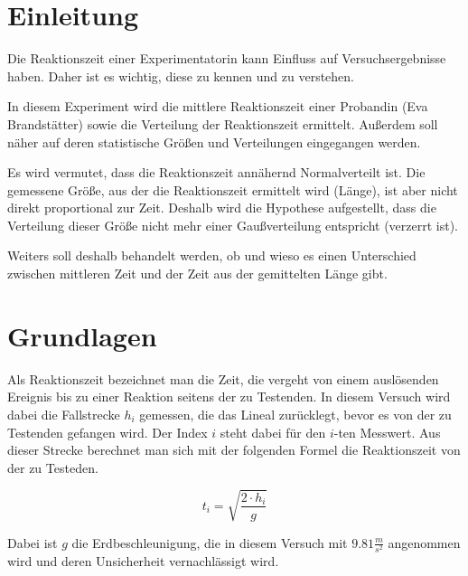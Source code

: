 \documentclass[a4paper,12pt]{article}
\begin{document}
\tableofcontents
\newpage


\section{Einleitung}

Die Reaktionszeit einer Experimentatorin kann Einfluss auf Versuchsergebnisse haben. Daher ist es wichtig,
diese zu kennen und zu verstehen.

In diesem Experiment wird die mittlere Reaktionszeit einer Probandin (Eva Brandstätter) sowie die Verteilung 
der Reaktionszeit ermittelt. Außerdem soll näher auf deren statistische Größen und Verteilungen
eingegangen werden.

Es wird vermutet, dass die Reaktionszeit annähernd Normalverteilt ist. Die gemessene Größe, aus der die
Reaktionszeit ermittelt wird (Länge), ist aber nicht direkt proportional zur Zeit. Deshalb wird die 
Hypothese aufgestellt, dass die Verteilung dieser Größe nicht mehr einer Gaußverteilung entspricht (verzerrt ist).

Weiters soll deshalb behandelt werden, ob und wieso es einen Unterschied zwischen mittleren Zeit und
der Zeit aus der gemittelten Länge gibt.

\section{Grundlagen}

Als Reaktionszeit bezeichnet man die Zeit, die vergeht von einem auslösenden Ereignis bis zu einer Reaktion seitens der zu Testenden.
In diesem Versuch wird dabei die Fallstrecke $h_i$ gemessen, die das Lineal zurücklegt, bevor es von der zu Testenden gefangen wird.
Der Index $i$ steht dabei für den $i$-ten Messwert.  
Aus dieser Strecke berechnet man sich mit der folgenden Formel die Reaktionszeit von der zu Testeden.

\begin{equation}
    t_i = \sqrt{\frac{2 \cdot h_i}{g}}
\end{equation}

Dabei ist $g$ die Erdbeschleunigung, die in diesem Versuch mit $9.81 \frac{m}{s^2}$ angenommen wird und deren Unsicherheit
vernachlässigt wird. 
\end{document}
